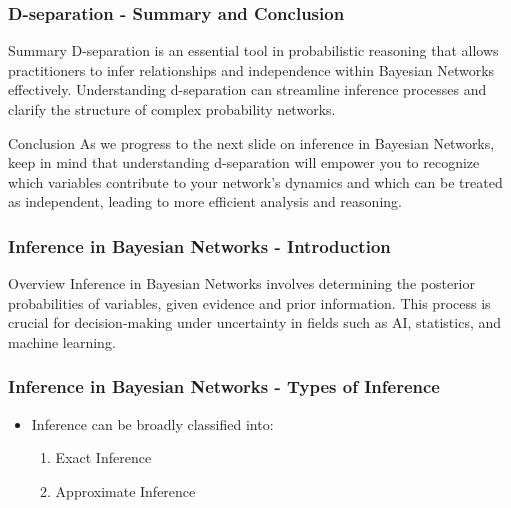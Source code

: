 \documentclass[aspectratio=169]{beamer}
\begin{document}
\begin{frame}[fragile]
    \frametitle{D-separation - Summary and Conclusion}
    \begin{block}{Summary}
        D-separation is an essential tool in probabilistic reasoning that allows 
        practitioners to infer relationships and independence within Bayesian 
        Networks effectively. Understanding d-separation can streamline inference 
        processes and clarify the structure of complex probability networks.
    \end{block}

    \begin{block}{Conclusion}
        As we progress to the next slide on inference in Bayesian Networks, keep 
        in mind that understanding d-separation will empower you to recognize 
        which variables contribute to your network’s dynamics and which can be 
        treated as independent, leading to more efficient analysis and reasoning.
    \end{block}
\end{frame}

\begin{frame}[fragile]
    \frametitle{Inference in Bayesian Networks - Introduction}
    \begin{block}{Overview}
        Inference in Bayesian Networks involves determining the posterior probabilities of variables, given evidence and prior information. 
        This process is crucial for decision-making under uncertainty in fields such as AI, statistics, and machine learning.
    \end{block}
\end{frame}

\begin{frame}[fragile]
    \frametitle{Inference in Bayesian Networks - Types of Inference}
    \begin{itemize}
        \item Inference can be broadly classified into:
        \begin{enumerate}
            \item Exact Inference
            \item Approximate Inference
        \end{enumerate}
    \end{itemize}
\end{frame}
\end{document}
